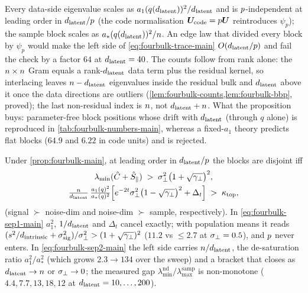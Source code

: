 Every data-side eigenvalue scales as $a_1(q(d_{\mathrm{latent}}))^2/d_{\mathrm{latent}}$ and is $p$-independent at leading order in $d_{\mathrm{latent}}/p$ (the code normalisation $\bm{U}_{\rm code}=p\bm{U}$ reintroduces $\psi_p$); the sample block scales as $a_*(q(d_{\mathrm{latent}}))^2/n$. An edge law that divided every block by $\psi_p$ would make the left side of \eqref{eq:fourbulk-trace-main} $O(d_{\mathrm{latent}}/p)$ and fail the check by a factor $64$ at $d_{\mathrm{latent}}=40$. The counts follow from rank alone: the $n\times n$ Gram equals a rank-$d_{\mathrm{latent}}$ data term plus the residual kernel, so interlacing leaves $n-d_{\mathrm{latent}}$ eigenvalues inside the residual bulk and $d_{\mathrm{latent}}$ above it once the data directions are outliers (\cref{lem:fourbulk-counts,lem:fourbulk-bbp}, proved); the last non-residual index is $n$, not $d_{\mathrm{latent}}+n$. What the proposition buys: parameter-free block positions whose drift with $d_{\mathrm{latent}}$ (through $q$ alone) is reproduced in \cref{tab:fourbulk-numbers-main}, whereas a fixed-$a_1$ theory predicts flat blocks ($64.9$ and $6.22$ in code units) and is rejected.

\begin{corollary}\label{cor:fourbulk-separation-main}
Under \cref{prop:fourbulk-main}, at leading order in $d_{\mathrm{latent}}/p$ the blocks are disjoint iff
\begin{gather}
\lambda_{\min}(\hat C+\hat S_\parallel)\;>\;\sigma_{\perp}^2\bigl(1+\sqrt{\gamma_\perp}\bigr)^2,\label{eq:fourbulk-sep1-main}\\
\tfrac{n}{d_{\mathrm{latent}}}\,\tfrac{a_1(q)^2}{a_*(q)^2}\Bigl[e^{-2t}\sigma_{\perp}^2\bigl(1-\sqrt{\gamma_\perp}\bigr)^2+\Delta_t\Bigr]\;>\;\kappa_{\mathrm{top}} ,\label{eq:fourbulk-sep2-main}
\end{gather}
(signal $\succ$ noise-dim and noise-dim $\succ$ sample, respectively). In \eqref{eq:fourbulk-sep1-main} $a_1^2$, $1/d_{\mathrm{latent}}$ and $\Delta_t$ cancel exactly; with population means it reads $(s^2/d_{\mathrm{intrinsic}}+\sigma_{\mathrm{sig}}^2)/\sigma_{\perp}^2>(1+\sqrt{\gamma_\perp})^2$ ($11.2$ vs $\le2.7$ at $\sigma_{\perp}=0.5$), and $p$ never enters. In \eqref{eq:fourbulk-sep2-main} the left side carries $n/d_{\mathrm{latent}}$, the de-saturation ratio $a_1^2/a_*^2$ (which grows $2.3\to134$ over the sweep) and a bracket that closes as $d_{\mathrm{latent}}\to n$ or $\sigma_{\perp}\to0$; the measured gap $\lambda^{\mathrm{nd}}_{\min}/\lambda^{\mathrm{samp}}_{\max}$ is non-monotone ($4.4,7.7,13,18,12$ at $d_{\mathrm{latent}}=10,\dots,200$).
\end{corollary}

